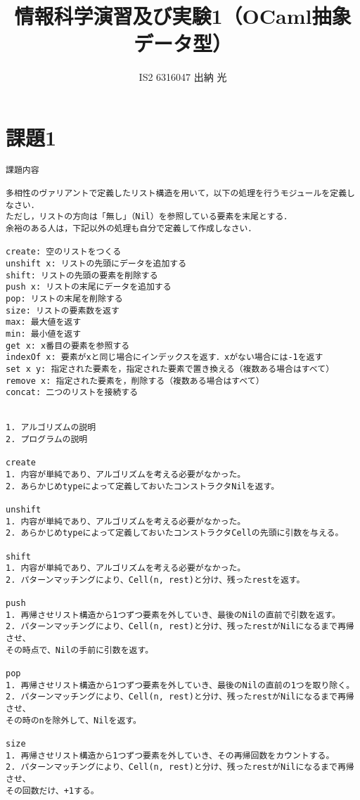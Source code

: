 \documentclass{jarticle}
\title{情報科学演習及び実験1（OCaml抽象データ型）}
\author{IS2 6316047 出納 光}
\begin{document}
\maketitle

\section{課題1}
\begin{verbatim}
課題内容

多相性のヴァリアントで定義したリスト構造を用いて，以下の処理を行うモジュールを定義しなさい．
ただし，リストの方向は「無し」（Nil）を参照している要素を末尾とする．
余裕のある人は，下記以外の処理も自分で定義して作成しなさい．

create: 空のリストをつくる
unshift x: リストの先頭にデータを追加する
shift: リストの先頭の要素を削除する
push x: リストの末尾にデータを追加する
pop: リストの末尾を削除する
size: リストの要素数を返す
max: 最大値を返す
min: 最小値を返す
get x: x番目の要素を参照する
indexOf x: 要素がxと同じ場合にインデックスを返す．xがない場合には-1を返す
set x y: 指定された要素を，指定された要素で置き換える（複数ある場合はすべて）
remove x: 指定された要素を，削除する（複数ある場合はすべて）
concat: 二つのリストを接続する


1. アルゴリズムの説明
2. プログラムの説明

create
1. 内容が単純であり、アルゴリズムを考える必要がなかった。
2. あらかじめtypeによって定義しておいたコンストラクタNilを返す。

unshift
1. 内容が単純であり、アルゴリズムを考える必要がなかった。
2. あらかじめtypeによって定義しておいたコンストラクタCellの先頭に引数を与える。

shift
1. 内容が単純であり、アルゴリズムを考える必要がなかった。
2. パターンマッチングにより、Cell(n, rest)と分け、残ったrestを返す。

push
1. 再帰させリスト構造から1つずつ要素を外していき、最後のNilの直前で引数を返す。
2. パターンマッチングにより、Cell(n, rest)と分け、残ったrestがNilになるまで再帰させ、
その時点で、Nilの手前に引数を返す。

pop
1. 再帰させリスト構造から1つずつ要素を外していき、最後のNilの直前の1つを取り除く。
2. パターンマッチングにより、Cell(n, rest)と分け、残ったrestがNilになるまで再帰させ、
その時のnを除外して、Nilを返す。

size
1. 再帰させリスト構造から1つずつ要素を外していき、その再帰回数をカウントする。
2. パターンマッチングにより、Cell(n, rest)と分け、残ったrestがNilになるまで再帰させ、
その回数だけ、+1する。


\end{verbatim}
\end{document}
